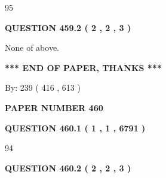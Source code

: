 \documentclass[12pt]{article}
\begin{document}
95
 
 
  
\vspace{0.2in}
  
{\textbf{\Large{QUESTION
459.2 
 ( 2 , 2 , 3 )
}}}
  
  
 
 
\noindent{}
 
 
 None of above.
 
 
 
 
   
   
 \vspace{0.2in}
 
   
   
   
   
\vspace{1.0in} 
{\textbf{\large{ *** END OF PAPER, THANKS *** }}} 
   
   
\hspace{1.0in} By: 
 239 ( 416 ,  613 )
   
   
   
   
\newpage 
\setcounter{page}{ 
   460001 } 
   
   
   
   
 {\textbf{ \Large{ PAPER NUMBER  460  }}}
   
   
\vspace{0.2in}
   
   
   
   
   
   
 \vspace{0.2in}
 
 
 
 
   
   
  
\vspace{0.2in}
  
{\textbf{\Large{QUESTION
460.1 
 ( 1 , 1 , 6791 )
}}}
  
  
 
 
\noindent{}

94
 
 
  
\vspace{0.2in}
  
{\textbf{\Large{QUESTION
460.2 
 ( 2 , 2 , 3 )
}}}
  
\end{document}
